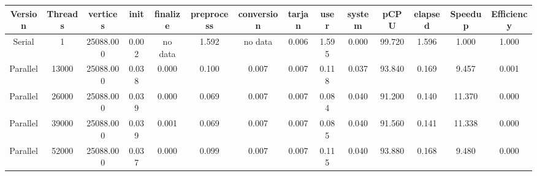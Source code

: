 \begin{tabular}{|c|c|c|c|c|c|c|c|c|c|c|c|c|c|}
\toprule
 Version &  Threads &  vertices &  init & finalize &  preprocess & conversion &  tarjan &  user &  system &   pCPU &  elapsed &  Speedup &  Efficiency \\
\midrule
  Serial &        1 & 25088.000 & 0.002 &  no data &       1.592 &    no data &   0.006 & 1.595 &   0.000 & 99.720 &    1.596 &    1.000 &       1.000 \\
Parallel &    13000 & 25088.000 & 0.038 &    0.000 &       0.100 &      0.007 &   0.007 & 0.118 &   0.037 & 93.840 &    0.169 &    9.457 &       0.001 \\
Parallel &    26000 & 25088.000 & 0.039 &    0.000 &       0.069 &      0.007 &   0.007 & 0.084 &   0.040 & 91.200 &    0.140 &   11.370 &       0.000 \\
Parallel &    39000 & 25088.000 & 0.039 &    0.001 &       0.069 &      0.007 &   0.007 & 0.085 &   0.040 & 91.560 &    0.141 &   11.338 &       0.000 \\
Parallel &    52000 & 25088.000 & 0.037 &    0.000 &       0.099 &      0.007 &   0.007 & 0.115 &   0.040 & 93.880 &    0.168 &    9.480 &       0.000 \\
\bottomrule
\end{tabular}
